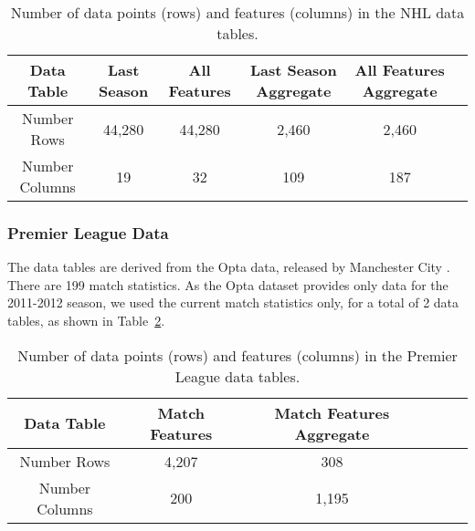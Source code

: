 \documentclass[oribibl]{llncs}%
\begin{document}
\begin{table}[htdp]
\caption{Number of data points (rows) and features (columns) in the NHL data tables.}
\begin{center}
\begin{tabular}{c|c|c|c|c|c}
 Data Table & Last Season & All Features & Last Season Aggregate & All Features Aggregate \\ \hline
Number Rows & 44,280 & 44,280 & 2,460 & 2,460 \\
\hline
Number Columns & 19 & 32 & 109 & 187
\end{tabular}
\end{center}
\label{table:nhl-data}
\end{table}%


%


\subsubsection{Premier League Data} The data tables are derived from the Opta data, released by Manchester City \cite{bib:opta-original}.
There are 199 match statistics. As the Opta dataset provides only data for the 2011-2012 season, we used the current match statistics only, for a total of 2 data tables, as shown in Table~\ref{table:pl-data}.

\begin{table}[htdp]
\caption{Number of data points (rows) and features (columns) in the Premier League data tables.}
\begin{center}
\begin{tabular}{c|c|c|c|c|c}
 Data Table & Match Features & Match Features Aggregate \\ \hline
Number Rows & 4,207 & 308 \\
\hline
Number Columns & 200 & 1,195
\end{tabular}
\end{center}
\label{table:pl-data}
\end{table}%
\end{document}
